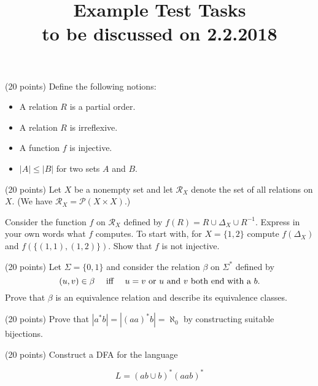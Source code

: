 \documentclass{article}
\begin{document}
\title{Example Test Tasks\\
 \small{{\bf{to be discussed on 2.2.2018}}} }
\date{}

\maketitle
\thispagestyle{empty}



 (20 points) \quad Define the following notions:
\begin{itemize}
	\item A relation $R$ is a partial order.
	\item A relation $R$ is irreflexive.
	\item A function $f$ is injective.
	\item $|A| \le |B|$ for two sets $A$ and $B$.
\end{itemize}

\vspace*{5mm}

 (20 points) \quad
Let $X$ be a nonempty set and let $\mathcal{R}_X$ denote the set of all relations on $X$. (We have $\mathcal{R}_X = \mathcal{P}(X \times X)$.)

Consider the function $f$ on $\mathcal{R}_X$ defined by $f(R) = R \cup \Delta_X \cup R^{-1}$. Express in your own words what $f$ computes. 
To start with, for $X = \{1,2\}$ compute $f(\Delta_X)$ and $f(\{(1,1), (1,2)\})$.
Show that $f$ is not injective.

\vspace*{5mm}


 (20 points) \quad
Let $\Sigma = \{0,1\}$ and consider the relation $\beta$ on $\Sigma^*$ defined by
$$ (u,v) \in \beta \quad \textrm{ iff \quad $u = v$ or $u$ and $v$ both end with a $b$}.$$
Prove that $\beta$ is an equivalence relation and describe its equivalence classes.

\vspace*{5mm}

 (20 points) \quad
Prove that $|a^*b| = |(aa)^*b| = \aleph_0$ by constructing suitable bijections. 

\vspace*{5mm}


 (20 points) \quad
Construct a DFA for the language

$$L = (ab \cup b)^*(aab)^*$$
\end{document}
